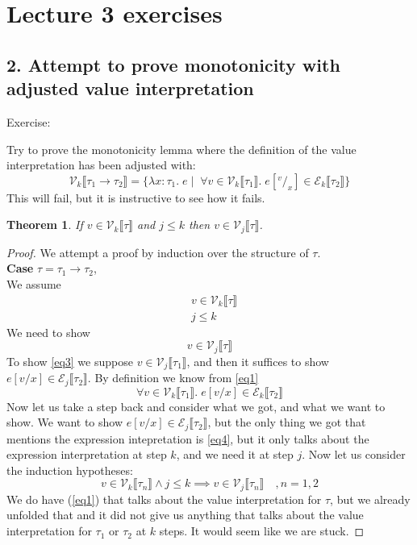 \documentclass[a4paper,10pt,fleqn]{article}
\newcommand{\sem}[1]{\ensuremath{\llbracket #1 \rrbracket}}
\newcommand{\curly}[1]{\ensuremath{\mathcal{#1}}}
\newcommand{\case}[1]{~\\{\bf Case} #1,~\\}
\newcommand{\subst}[3]{\ensuremath{\ensuremath{#1[#2/#3]}}}
\newcommand{\tlabs}[3]{\ensuremath{\lambda #1 : #2 . \; #3}}
\newcommand{\vbar}{\ensuremath{\; | \;}}
\newcommand{\tarrow}[2]{\ensuremath{ #1 \rightarrow #2}}
\newcommand{\pres}[3]{\ensuremath{\curly{#1}_{#2}\sem{#3}}}
\newcommand{\epres}[2][k]{\ensuremath{\pres{E}{#1}{#2}}}
\newcommand{\vpres}[2][k]{\ensuremath{\pres{V}{#1}{#2}}}
\newcommand{\sub}[3]{\ensuremath{#1[^{#2}/_{#3}]}}
\newtheorem*{theorem}{Theorem}
\begin{document}
\section*{Lecture 3 exercises}
\subsection*{2. Attempt to prove monotonicity with adjusted value interpretation}
Exercise:
\begin{displayquote}
Try to prove the monotonicity lemma where the definition of the value interpretation has been adjusted with:
\[
\vpres{\tarrow{\tau_1}{\tau_2}} = \{\tlabs{x}{\tau_1}{e} \vbar \; \forall v \in \vpres{\tau_1}. \; \sub{e}{v}{x} \in \epres{\tau_2} \}
\]
This will fail, but it is instructive to see how it fails.
\end{displayquote}
\begin{theorem}
  If $v\in \vpres{\tau}$ and $j \leq k$  then $v \in \vpres[j]{\tau}$.
\end{theorem}
\begin{proof}\renewcommand{\qedsymbol}{$\times$}
We attempt a proof by induction over the structure of $\tau$.
\case{$\tau = \tarrow{\tau_1}{\tau_2}$} 
We assume 
\begin{align}
  & v \in \vpres{\tau} \label{eq1} \\
  & j \leq k           \nonumber 
\end{align}
We need to show 
\begin{equation}
  v\in\vpres[j]{\tau}    \label{eq3}
\end{equation}
To show \ref{eq3} we suppose $v\in \vpres[j]{\tau_1}$, and then it suffices to show $\subst{e}{v}{x} \in \epres[j]{\tau_2}$. By definition we know from \ref{eq1} 
\begin{equation}
  \forall v \in \vpres{\tau_1}.\; \subst{e}{v}{x} \in \epres{\tau_2} \label{eq4}
\end{equation}
Now let us take a step back and consider what we got, and what we want to show. We want to show $\subst{e}{v}{x} \in \epres[j]{\tau_2}$, but the only thing we got that mentions the expression intepretation is \ref{eq4}, but it only talks about the expression interpretation at step $k$, and we need it at step $j$. Now let us consider the induction hypotheses:
\begin{equation}
  v\in \vpres{\tau_n} \wedge 
  j \leq k 
  \implies v \in \vpres[j]{\tau_n}\quad, n=1,2 \nonumber
\end{equation}
We do have (\ref{eq1}) that talks about the value interpretation for $\tau$, but we already unfolded that and it did not give us anything that talks about the value interpretation for $\tau_1$ or $\tau_2$ at $k$ steps. It would seem like we are stuck.
\end{proof}
\end{document}
